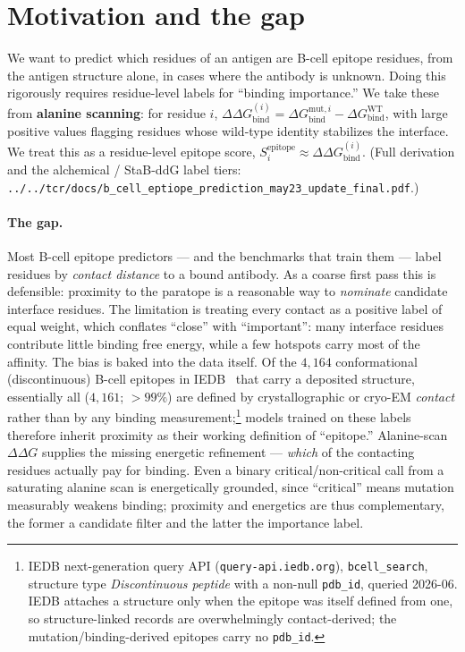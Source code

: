 \section{Motivation and the gap}\label{sec:motivation}

We want to predict which residues of an antigen are B-cell epitope residues, from the antigen
structure alone, in cases where the antibody is unknown. Doing this rigorously requires
residue-level labels for ``binding importance.'' We take these from \textbf{alanine scanning}:
for residue $i$, $\Delta\Delta G_\mathrm{bind}^{(i)} = \Delta G_\mathrm{bind}^{\mathrm{mut},i} -
\Delta G_\mathrm{bind}^{\mathrm{WT}}$, with large positive values flagging residues whose
wild-type identity stabilizes the interface. We treat this as a residue-level epitope score,
$S_i^\mathrm{epitope} \approx \Delta\Delta G_\mathrm{bind}^{(i)}$. (Full derivation and the
alchemical / StaB-ddG label tiers: \texttt{../../tcr/docs/b\_cell\_eptiope\_prediction\_may23\_update\_final.pdf}.)

\paragraph{The gap.} Most B-cell epitope predictors --- and the benchmarks that train them ---
label residues by \emph{contact distance} to a bound antibody. As a coarse first pass this is
defensible: proximity to the paratope is a reasonable way to \emph{nominate} candidate interface
residues. The limitation is treating every contact as a positive label of equal weight, which
conflates ``close'' with ``important'': many interface residues contribute little binding free
energy, while a few hotspots carry most of the affinity. The bias is baked into the data itself.
Of the $4{,}164$ conformational (discontinuous) B-cell epitopes in IEDB~\cite{vita2019} that carry a deposited
structure, essentially all ($4{,}161$; $>99\%$) are defined by crystallographic or cryo-EM
\emph{contact} rather than by any binding measurement;\footnote{IEDB next-generation query API
(\texttt{query-api.iedb.org}), \texttt{bcell\_search}, structure type \emph{Discontinuous peptide}
with a non-null \texttt{pdb\_id}, queried 2026-06. IEDB attaches a structure only when the epitope
was itself defined from one, so structure-linked records are overwhelmingly contact-derived; the
mutation/binding-derived epitopes carry no \texttt{pdb\_id}.} models trained on these labels
therefore inherit proximity as their working definition of ``epitope.'' Alanine-scan
$\Delta\Delta G$ supplies the missing energetic refinement --- \emph{which} of the contacting
residues actually pay for binding. Even a binary critical/non-critical call from a saturating
alanine scan is energetically grounded, since ``critical'' means mutation measurably weakens
binding; proximity and energetics are thus complementary, the former a candidate filter and the
latter the importance label.

